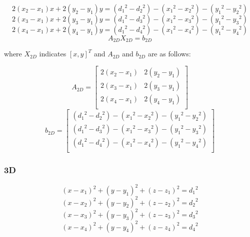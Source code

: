 \documentclass{ieeeaccess}
\begin{document}
\begin{equation}
2(x_2-x_1)x+2(y_2-y_1)y=({d_1}^2-{d_2}^2)-({x_1}^2-{x_2}^2)-({y_1}^2-{y_2}^2)
\end{equation}
\begin{equation}
2(x_3-x_1)x+2(y_3-y_1)y=({d_1}^2-{d_3}^2)-({x_1}^2-{x_3}^2)-({y_1}^2-{y_3}^2)
\end{equation}
\begin{equation}
2(x_4-x_1)x+2(y_4-y_1)y=({d_1}^2-{d_4}^2)-({x_1}^2-{x_4}^2)-({y_1}^2-{y_4}^2)
\end{equation}
\begin{equation}
A_{2D}X_{2D}=b_{2D}
\end{equation}

where $X_{2D}$ indicates $[x,y]^T$ and $A_{2D}$ and $b_{2D}$ are as follows: 

\begin{equation}
A_{2D} =\left[ {\begin{array}{cc}
	2(x_2-x_1) & 2(y_2-y_1)\\
	2(x_3-x_1) & 2(y_3-y_1)\\
	2(x_4-x_1) & 2(y_4-y_1)\\
	\end{array} } \right]
\end{equation}
\begin{equation}
b_{2D} = \left[ {\begin{array}{c}
	({d_1}^2-{d_2}^2)-({x_1}^2-{x_2}^2)-({y_1}^2-{y_2}^2)\\
	({d_1}^2-{d_3}^2)-({x_1}^2-{x_3}^2)-({y_1}^2-{y_3}^2)\\
	({d_1}^2-{d_4}^2)-({x_1}^2-{x_4}^2)-({y_1}^2-{y_4}^2)\\
	\end{array} } \right]
\end{equation}

\subsubsection{3D}

\begin{equation}
(x-x_1)^2+(y-y_1)^2+(z-z_1)^2={d_1}^2
\end{equation}
\begin{equation}
(x-x_2)^2+(y-y_2)^2+(z-z_2)^2={d_2}^2
\end{equation}
\begin{equation}
(x-x_3)^2+(y-y_3)^2+(z-z_3)^2={d_3}^2
\end{equation}
\begin{equation}
(x-x_4)^2+(y-y_4)^2+(z-z_4)^2={d_4}^2
\end{equation}
\end{document}
